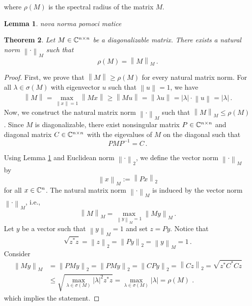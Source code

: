 \documentclass{article}
\newtheorem{theo}{Theorem}
\newtheorem{lem}[theo]{Lemma}
\newcommand{\norm}[2]{\left\lVert#1\right\rVert_{#2}}
\begin{document}
where $\rho(M)$ is the spectral radius of the matrix $M$.

\begin{lem}
\label{lem:vectNorm}
nova norma pomoci matice
\end{lem}


\begin{theo}
Let $M\in\mathbb{C}^{n\times n}$ be a diagonalizable matrix. There exists a natural norm $\norm{\cdot}{M}$ such that 
$$
\rho(M)=\norm{M}{M}\,.
$$
\end{theo}
\begin{proof}
First, we prove that $\norm{M}{}\geq\rho(M)$ for every natural matrix norm. For all $\lambda\in\sigma(M)$ with eigenvector $u$ such that $\norm{u}{}=1$, we have
$$
\norm{M}{}=\max_{\norm{x}{}=1} \norm{Mx}{}\geq \norm{Mu}{}=\norm{\lambda u}{}=|\lambda|\cdot\norm{u}{}=|\lambda|\,.
$$
Now, we construct the natural matrix norm $\norm{\cdot}{M}$ such that $\norm{M}{M}\leq\rho(M)$. Since $M$ is diagonalizable, there exist nonsingular matrix $P\in\mathbb{C}^{n\times n}$ and diagonal matrix $C\in\mathbb{C}^{n\times n}$ with the eigevalues of $M$ on the diagonal such that 
$$
PMP^{-1}=C\,.
$$ 

Using Lemma \ref{lem:vectNorm} and Euclidean norm $\norm{\cdot}{2}$, we define the vector norm $\norm{\cdot}{M}$ by 
\begin{equation}
\norm{x}{M}:=\norm{Px}{2}
\end{equation}
for all $x\in\mathbb{C}^n$. The natural matrix norm $\norm{\cdot}{M}$ is induced by the vector norm $\norm{\cdot}{M}$, i.e.,
$$
\norm{M}{M}=\max_{\norm{y}{M}=1} \norm{My}{M}\,.
$$
Let $y$ be a  vector such that $\norm{y}{M}=1$ and set $z=Py$. Notice that 
$$
\sqrt{z^*z}=\norm{z}{2}=\norm{Py}{2}=\norm{y}{M}=1\,.
$$
Consider
\begin{align*}
\norm{My}{M}&=\norm{PMy}{2}=\norm{PMy}{2}=\norm{CPy}{2}=\norm{Cz}{2}=\sqrt{z^*C^*Cz}\\
    &\leq \sqrt{\max_{\lambda\in\sigma(M)}|\lambda|^2 z^*z}=\max_{\lambda\in\sigma(M)}|\lambda|=\rho(M)\,\,.
\end{align*}
which implies the statement.
\end{proof}
\end{document}
